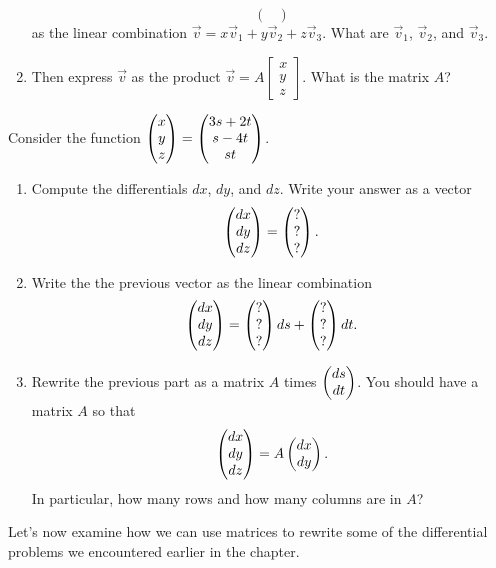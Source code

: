 \begin{problem}
\begin{enumerate}
$$\begin{pmatrix}
\end{pmatrix}
$$
as the linear combination $\vec v = x\vec v_1+y\vec v_2+z\vec v_3$. What are $\vec v_1$, $\vec v_2$, and $\vec v_3$.
\item  
{}%
Then express $\vec v$ as the product $\vec v = A\begin{bmatrix}x\\y\\z\end{bmatrix}.$  What is the matrix $A$?  
\end{enumerate}
\end{problem}




\begin{problem}
 Consider the function $\begin{pmatrix} x\\y\\z \end{pmatrix}=\begin{pmatrix} 3s+2t\\s-4t\\st \end{pmatrix}$.  
\begin{enumerate}
 \item Compute the differentials $dx$, $dy$, and $dz$.  Write your answer as a vector $$\begin{pmatrix} dx\\dy\\dz \end{pmatrix}=\begin{pmatrix} ?\\?\\? \end{pmatrix}.$$
 \item Write the the previous vector as the linear combination
$$\begin{pmatrix} dx\\dy\\dz \end{pmatrix}=\begin{pmatrix} ?\\?\\? \end{pmatrix}ds+\begin{pmatrix} ?\\?\\? \end{pmatrix}dt.$$
 \item Rewrite the previous part as a matrix $A$ times $\begin{pmatrix} ds\\dt \end{pmatrix}$. You should have a matrix $A$ so that $$\begin{pmatrix} dx\\dy\\dz \end{pmatrix}=A\begin{pmatrix} dx\\dy \end{pmatrix}.$$ In particular, how many rows and how many columns are in $A$?
\end{enumerate}

\end{problem}



Let's now examine how we can use matrices to rewrite some of the differential problems we encountered earlier in the chapter.  



